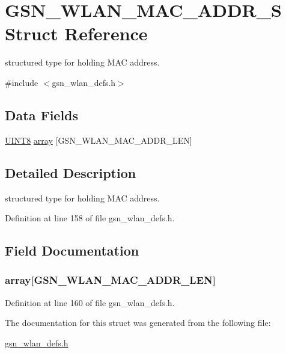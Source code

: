 \hypertarget{a00416}{
\section{GSN\_\-WLAN\_\-MAC\_\-ADDR\_\-S Struct Reference}
\label{a00416}
}


structured type for holding MAC address.  




{\ttfamily \#include $<$gsn\_\-wlan\_\-defs.h$>$}

\subsection*{Data Fields}
\begin{DoxyCompactItemize}
\item 
\hyperlink{a00660_gab27e9918b538ce9d8ca692479b375b6a}{UINT8} \hyperlink{a00416_a7e65f0551da4be5b8be42779a485a497}{array} \mbox{[}GSN\_\-WLAN\_\-MAC\_\-ADDR\_\-LEN\mbox{]}
\end{DoxyCompactItemize}


\subsection{Detailed Description}
structured type for holding MAC address. 

Definition at line 158 of file gsn\_\-wlan\_\-defs.h.



\subsection{Field Documentation}
\hypertarget{a00416_a7e65f0551da4be5b8be42779a485a497}{
\subsubsection[{array}]{ {\bf array}\mbox{[}GSN\_\-WLAN\_\-MAC\_\-ADDR\_\-LEN\mbox{]}}}
\label{a00416_a7e65f0551da4be5b8be42779a485a497}


Definition at line 160 of file gsn\_\-wlan\_\-defs.h.



The documentation for this struct was generated from the following file:\begin{DoxyCompactItemize}
\item 
\hyperlink{a00614}{gsn\_\-wlan\_\-defs.h}\end{DoxyCompactItemize}

